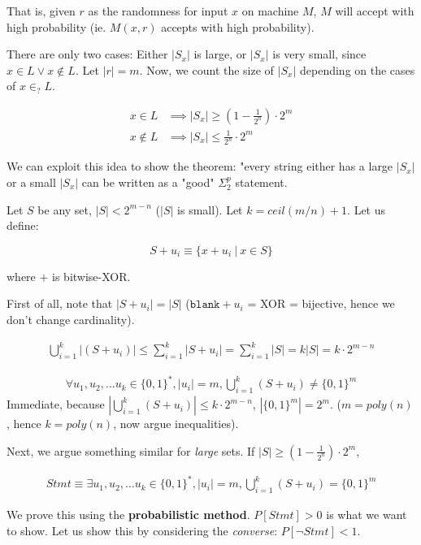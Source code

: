 That is, given $r$ as the randomness for input $x$ on machine $M$, $M$ will
accept with high probability (ie. $M(x, r)$ accepts with high probability).


There are only two cases: Either $|S_x|$ is large, or $|S_x|$ is very small,
since $x \in L \lor x \notin L$.  Let $|r| = m$. Now, we count the size
of $|S_x|$ depending on the cases of $x \in_? L$.


\begin{align*}
    x \in L &\implies |S_x| \geq (1 - \frac{1}{2^n}) \cdot 2^m \\
    x \notin L &\implies |S_x| \leq \frac{1}{2^n} \cdot 2^m
\end{align*}

We can exploit this idea to show the theorem: "every string either has a large
$|S_x|$ or a small $|S_x|$ can be written as a "good" $\Sigma_2^p$ statement.


Let $S$ be any set, $|S|< 2^{m - n}$ ($|S|$ is small). Let $k = ceil(m / n) + 1$.
Let us define:

$$
S + u_i \equiv \{ x + u_i~\vert~x \in S \}
$$

where $+$ is bitwise-XOR.

First of all, note that $|S + u_i| = |S|$ ($\texttt{blank} + u_i$ = XOR = bijective, hence we don't change cardinality).


\begin{align*}
    \bigcup_{i=1}^k |(S + u_i)| \leq \sum_{i=1}^k |S + u_i| = \sum_{i=1}^k |S| = k |S| = k \cdot 2^{m - n}
\end{align*}


\begin{align*}
    \forall u_1, u_2, \dots u_k \in \{0, 1\}^*, |u_i| = m, \bigcup_{i=1}^k (S + u_i) \neq \{0, 1\}^m
\end{align*}
Immediate, because $|\bigcup_{i=1}^k (S + u_i)| \leq k \cdot 2^{m - n}$,
$|\{0, 1\}^m| = 2^m$.  ($m = poly(n)$, hence $k = poly(n)$, now argue inequalities).


Next, we argue something similar for \textit{large} sets. 
If $|S| \geq (1 - \frac{1}{2^n}) \cdot 2^m$,

\begin{align*}
    Stmt \equiv \exists u_1, u_2, \dots u_k \in \{0, 1\}^*, |u_i| = m, \bigcup_{i=1}^k (S + u_i) = \{0, 1\}^m
\end{align*}

We prove this using the \textbf{probabilistic method}.  $P[Stmt] > 0$ is what we want to show.
Let us show this by considering the \textit{converse}: $P[\lnot Stmt] < 1$. 


